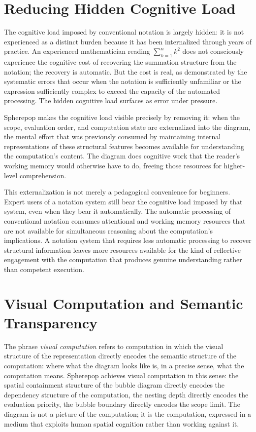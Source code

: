 \documentclass[12pt,openany]{book}
\theoremstyle{plain}
\theoremstyle{definition}
\theoremstyle{remark}
\begin{document}
\section{Reducing Hidden Cognitive Load}

The cognitive load imposed by conventional notation is largely hidden: it is not experienced as a distinct burden because it has been internalized through years of practice. An experienced mathematician reading $\sum_{k=1}^{n} k^2$ does not consciously experience the cognitive cost of recovering the summation structure from the notation; the recovery is automatic. But the cost is real, as demonstrated by the systematic errors that occur when the notation is sufficiently unfamiliar or the expression sufficiently complex to exceed the capacity of the automated processing. The hidden cognitive load surfaces as error under pressure.

Spherepop makes the cognitive load visible precisely by removing it: when the scope, evaluation order, and computation state are externalized into the diagram, the mental effort that was previously consumed by maintaining internal representations of these structural features becomes available for understanding the computation's content. The diagram does cognitive work that the reader's working memory would otherwise have to do, freeing those resources for higher-level comprehension.

This externalization is not merely a pedagogical convenience for beginners. Expert users of a notation system still bear the cognitive load imposed by that system, even when they bear it automatically. The automatic processing of conventional notation consumes attentional and working memory resources that are not available for simultaneous reasoning about the computation's implications. A notation system that requires less automatic processing to recover structural information leaves more resources available for the kind of reflective engagement with the computation that produces genuine understanding rather than competent execution.

\section{Visual Computation and Semantic Transparency}

The phrase \emph{visual computation} refers to computation in which the visual structure of the representation directly encodes the semantic structure of the computation: where what the diagram looks like is, in a precise sense, what the computation means. Spherepop achieves visual computation in this sense: the spatial containment structure of the bubble diagram directly encodes the dependency structure of the computation, the nesting depth directly encodes the evaluation priority, the bubble boundary directly encodes the scope limit. The diagram is not a picture of the computation; it is the computation, expressed in a medium that exploits human spatial cognition rather than working against it.
\end{document}
